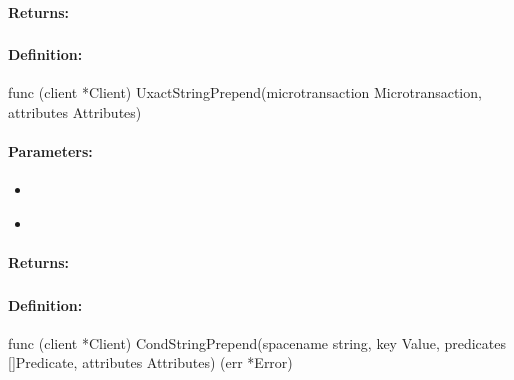 \paragraph{Returns:}


\pagebreak
\subsubsection{}
\label{api:Go:UxactStringPrepend}


\paragraph{Definition:}
\begin{gocode}
func (client *Client) UxactStringPrepend(microtransaction Microtransaction, attributes Attributes)
\end{gocode}

\paragraph{Parameters:}
\begin{itemize}[noitemsep]
\item {}\\

\item {}\\

\end{itemize}

\paragraph{Returns:}


\pagebreak
\subsubsection{}
\label{api:Go:CondStringPrepend}


\paragraph{Definition:}
\begin{gocode}
func (client *Client) CondStringPrepend(spacename string, key Value, predicates []Predicate, attributes Attributes) (err *Error)
\end{gocode}

